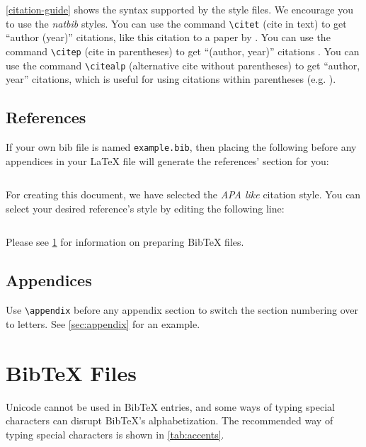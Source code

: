 \documentclass[11pt]{article}
\begin{document}
\cref{citation-guide} shows the syntax supported by the style files. We encourage you to use the \emph{natbib} styles.
You can use the command \verb|\citet| (cite in text) to get ``author (year)'' citations, like this citation to a paper by \citet{Doe23}.
You can use the command \verb|\citep| (cite in parentheses) to get ``(author, year)'' citations \citep{Doe23}.
You can use the command \verb|\citealp| (alternative cite without parentheses) to get ``author, year'' citations, which is useful for using citations within parentheses (e.g. \citealp{Doe23}).

\subsection{References}
If your own bib file is named \texttt{example.bib}, then placing the following before any appendices in your \LaTeX{} file will generate the references' section for you:
\begin{quote}
\begin{verbatim}

\end{verbatim}
\end{quote}

For creating this document, we have selected the \emph{APA like} citation style. You can select your desired reference's style by editing the following line:
\begin{quote}
\begin{verbatim}

\end{verbatim}
\end{quote}

Please see \cref{sec:bibtex} for information on preparing Bib\TeX{} files.

\subsection{Appendices}
Use \verb|\appendix| before any appendix section to switch the section numbering over to letters. See \cref{sec:appendix} for an example.

\section{Bib\TeX{} Files}
\label{sec:bibtex}
Unicode cannot be used in Bib\TeX{} entries, and some ways of typing special characters can disrupt Bib\TeX's alphabetization. The recommended way of typing special characters is shown in \cref{tab:accents}.
\end{document}
